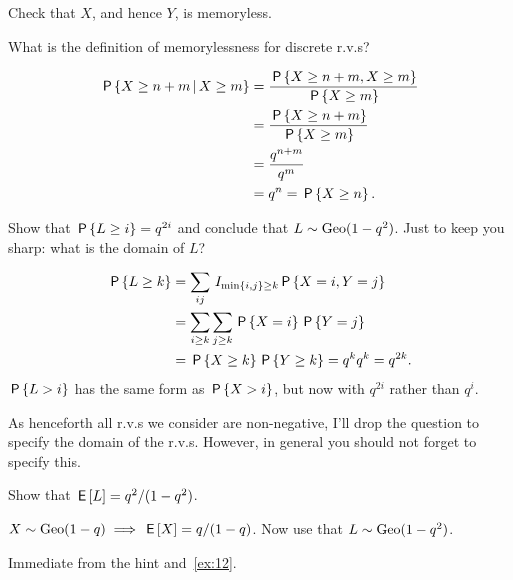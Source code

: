 \documentclass[a4paper,11pt]{article}
\begin{document}
\begin{exercise}
Check that $X$, and hence $Y$, is memoryless.
\begin{hint}
What is the definition of memorylessness for discrete r.v.s?  
\end{hint}
\begin{solution}
  \begin{align}
    \label{eq:13}
\P{X\geq n+m\given X\geq m} 
&= \frac{ \P{X\geq n+m,  X\geq m}}{\P{X\geq m}} \\
&= \frac{ \P{X\geq n+m}}{\P{X\geq m}} \\
&= \frac{ q^{n+m}}{q^m} \\
&= q^n= \P{X\geq n}.
  \end{align}
\end{solution}
\end{exercise}

\begin{exercise}\label{ex:12}
Show that $\P{L\geq i}=q^{2i}$ and conclude that $L\sim\Geo{1-q^{2}}$. Just to keep you sharp: what is the domain of $L$?
\begin{solution}
  \begin{align}
    \label{eq:12}
\P{L\geq k} 
&= \sum_{ij} \1{\min{i,j}\geq k} \P{X=i, Y=j}\\
&= \sum_{i\geq k} \sum_{j\geq k} \P{X=i}\P{Y=j}\\
&=  \P{X\geq k}\P{Y\geq k} = q^{k} q^{k} = q^{2k}.
  \end{align}
$\P{L>i}$ has the same form as $\P{X>i}$, but now with $q^{2i}$ rather than $q^{i}$.
\end{solution}
\end{exercise}

As henceforth all r.v.s we consider are non-negative, I'll drop the question to specify the domain of the r.v.s. However, in general you should not forget to specify this. 



\begin{exercise}\label{ex:3}
Show that  $\E L=q^{2}/(1-q^{2})$.
\begin{hint}
$X\sim \Geo{1-q} \implies \E X = q/(1-q)$. Now use that $L\sim\Geo{1-q^{2}}$. 
\end{hint}
\begin{solution}
  Immediate from the hint and~\cref{ex:12}. 
\end{solution}
\end{exercise}
\end{document}
